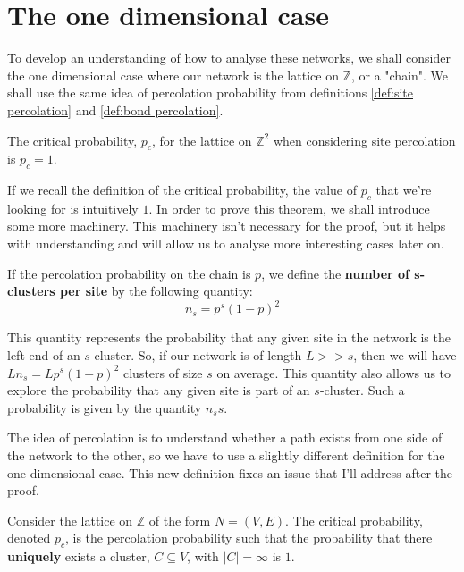 \section{The one dimensional case}
To develop an understanding of how to analyse these networks, we shall consider the one dimensional case where our network is the lattice on $\mathbb{Z}$, or a "chain". We shall use the same
idea of percolation probability from definitions \ref{def:site percolation} and \ref{def:bond percolation}.

\begin{theorem}\label{thm:critical probability z1 site percolation}
  The critical probability, $p_c$, for the lattice on $\mathbb{Z}^2$ when considering site percolation is $p_c = 1$.
\end{theorem}

If we recall the definition of the critical probability, the value of $p_c$ that we're looking for is intuitively $1$. In order to prove this theorem, we shall introduce some more
machinery. This machinery isn't necessary for the proof, but it helps with understanding and will allow us to analyse more interesting cases later on.

\begin{definition}\label{def:s-clusters per site}
  If the percolation probability on the chain is $p$, we define the \textbf{number of $\mathbf{s}$-clusters per site} by the following quantity:
  $$n_s = p^s(1-p)^2$$
\end{definition}

This quantity represents the probability that any given site in the network is the left end of an $s$-cluster. So, if our network is of length $L >> s$, then we will have
$Ln_s=Lp^s(1-p)^2$ clusters of size $s$ on average. This quantity also allows us to explore the probability that any given site is part of an $s$-cluster. Such a probability is
given by the quantity $n_ss$.

The idea of percolation is to understand whether a path exists from one side of the network to the other, so we have to use a slightly different definition for the one dimensional
case. This new definition fixes an issue that I'll address after the proof.

\begin{definition}\label{def:critical probability special case}
  Consider the lattice on $\mathbb{Z}$ of the form $N = (V, E)$. The critical probability, denoted $p_c$, is the percolation probability such that the probability that there
  \textbf{uniquely} exists a cluster, $C
  \subseteq V$, with $|C| = \infty$ is $1$.
\end{definition}

